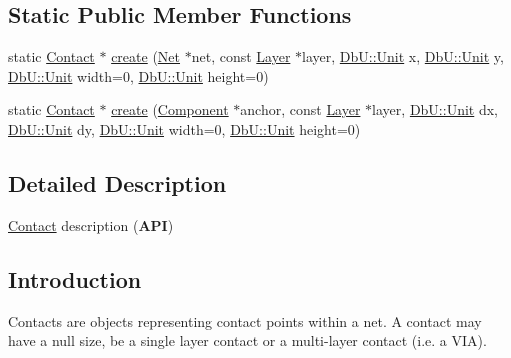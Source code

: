 \subsection*{Static Public Member Functions}
\begin{DoxyCompactItemize}
\item 
static \mbox{\hyperlink{classHurricane_1_1Contact}{Contact}} $\ast$ \mbox{\hyperlink{classHurricane_1_1Contact_ab66989c2dce4d398f1f7647aca50d983}{create}} (\mbox{\hyperlink{classHurricane_1_1Net}{Net}} $\ast$net, const \mbox{\hyperlink{classHurricane_1_1Layer}{Layer}} $\ast$layer, \mbox{\hyperlink{group__DbUGroup_ga4fbfa3e8c89347af76c9628ea06c4146}{Db\+U\+::\+Unit}} x, \mbox{\hyperlink{group__DbUGroup_ga4fbfa3e8c89347af76c9628ea06c4146}{Db\+U\+::\+Unit}} y, \mbox{\hyperlink{group__DbUGroup_ga4fbfa3e8c89347af76c9628ea06c4146}{Db\+U\+::\+Unit}} width=0, \mbox{\hyperlink{group__DbUGroup_ga4fbfa3e8c89347af76c9628ea06c4146}{Db\+U\+::\+Unit}} height=0)
\item 
static \mbox{\hyperlink{classHurricane_1_1Contact}{Contact}} $\ast$ \mbox{\hyperlink{classHurricane_1_1Contact_a2e555edb8984b599c391f16db105c1f5}{create}} (\mbox{\hyperlink{classHurricane_1_1Component}{Component}} $\ast$anchor, const \mbox{\hyperlink{classHurricane_1_1Layer}{Layer}} $\ast$layer, \mbox{\hyperlink{group__DbUGroup_ga4fbfa3e8c89347af76c9628ea06c4146}{Db\+U\+::\+Unit}} dx, \mbox{\hyperlink{group__DbUGroup_ga4fbfa3e8c89347af76c9628ea06c4146}{Db\+U\+::\+Unit}} dy, \mbox{\hyperlink{group__DbUGroup_ga4fbfa3e8c89347af76c9628ea06c4146}{Db\+U\+::\+Unit}} width=0, \mbox{\hyperlink{group__DbUGroup_ga4fbfa3e8c89347af76c9628ea06c4146}{Db\+U\+::\+Unit}} height=0)
\end{DoxyCompactItemize}


\subsection{Detailed Description}
\mbox{\hyperlink{classHurricane_1_1Contact}{Contact}} description ({\bfseries A\+PI}) 

\hypertarget{classHurricane_1_1Contact_secContactIntro}{}\subsection{Introduction}\label{classHurricane_1_1Contact_secContactIntro}
Contacts are objects representing contact points within a net. A contact may have a null size, be a single layer contact or a multi-\/layer contact (i.\+e. a V\+IA). 

